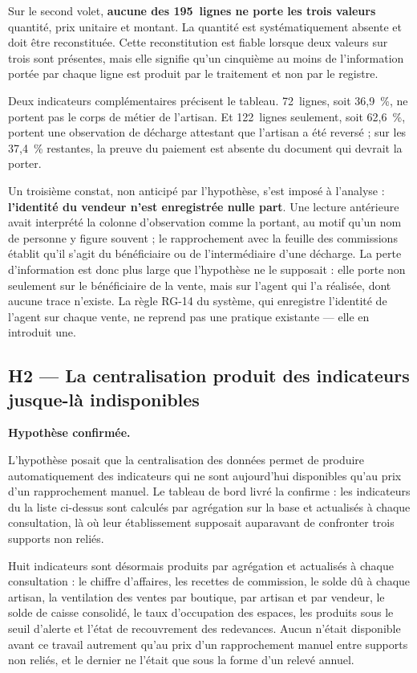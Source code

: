 Sur le second volet, \textbf{aucune des 195~lignes ne porte les trois valeurs} quantité, prix unitaire et montant. La quantité est systématiquement absente et doit être reconstituée. Cette reconstitution est fiable lorsque deux valeurs sur trois sont présentes, mais elle signifie qu'un cinquième au moins de l'information portée par chaque ligne est produit par le traitement et non par le registre.

Deux indicateurs complémentaires précisent le tableau. 72~lignes, soit 36,9~\%, ne portent pas le corps de métier de l'artisan. Et 122~lignes seulement, soit 62,6~\%, portent une observation de décharge attestant que l'artisan a été reversé ; sur les 37,4~\% restantes, la preuve du paiement est absente du document qui devrait la porter.

Un troisième constat, non anticipé par l'hypothèse, s'est imposé à l'analyse : \textbf{l'identité du vendeur n'est enregistrée nulle part}. Une lecture antérieure avait interprété la colonne d'observation comme la portant, au motif qu'un nom de personne y figure souvent ; le rapprochement avec la feuille des commissions établit qu'il s'agit du bénéficiaire ou de l'intermédiaire d'une décharge. La perte d'information est donc plus large que l'hypothèse ne le supposait : elle porte non seulement sur le bénéficiaire de la vente, mais sur l'agent qui l'a réalisée, dont aucune trace n'existe. La règle RG-14 du système, qui enregistre l'identité de l'agent sur chaque vente, ne reprend pas une pratique existante --- elle en introduit une.

\subsection{H2 --- La centralisation produit des indicateurs jusque-là indisponibles}

\noindent\textbf{Hypothèse confirmée.}

L'hypothèse posait que la centralisation des données permet de produire automatiquement des indicateurs qui ne sont aujourd'hui disponibles qu'au prix d'un rapprochement manuel. Le tableau de bord livré la confirme : les indicateurs du la liste ci-dessus sont calculés par agrégation sur la base et actualisés à chaque consultation, là où leur établissement supposait auparavant de confronter trois supports non reliés.

Huit indicateurs sont désormais produits par agrégation et actualisés à chaque consultation : le chiffre d'affaires, les recettes de commission, le solde dû à chaque artisan, la ventilation des ventes par boutique, par artisan et par vendeur, le solde de caisse consolidé, le taux d'occupation des espaces, les produits sous le seuil d'alerte et l'état de recouvrement des redevances. Aucun n'était disponible avant ce travail autrement qu'au prix d'un rapprochement manuel entre supports non reliés, et le dernier ne l'était que sous la forme d'un relevé annuel.

